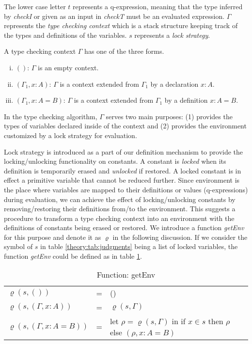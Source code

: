 The lower case letter $t$ represents a q-expression, meaning that the type inferred by \emph{checkI} or given as an input in \emph{checkT} must be an evaluated expression. $\Gamma$ represents the \emph{type checking context} which is a stack structure keeping track of the types and definitions of the variables. $s$ represents a \emph{lock strategy}. 
\begin{definition}
  A type checking context $\Gamma$ has one of the three forms.
  \begin{enumerate}[(i)]
  \item $()$: $\Gamma$ is an empty context.
  \item $(\Gamma_1, x : A)$: $\Gamma$ is a context extended from $\Gamma_1$ by a declaration $x:A$.
  \item $(\Gamma_1, x : A = B)$: $\Gamma$ is a context extended from $\Gamma_1$ by a definition $x:A=B$.
  \end{enumerate}
\end{definition}
In the type checking algorithm, $\Gamma$ serves two main purposes: (1) provides the types of variables declared inside of the context and (2) provides the environment customized by a lock strategy for evaluation.

Lock strategy is introduced as a part of our definition mechanism to provide the locking/unlocking functionality on constants. A constant is \emph{locked} when its definition is temporarily erased and \emph{unlocked} if restored. A locked constant is in effect a primitive variable that cannot be reduced further. Since environment is the place where variables are mapped to their definitions or values (q-expressions) during evaluation, we can achieve the effect of locking/unlocking constants by removing/restoring their definitions from/to the environment. This suggests a procedure to transform a type checking context into an environment with the definitions of constants being erased or restored. We introduce a function \emph{getEnv} for this purpose and denote it as $\varrho$ in the following discussion. If we consider the symbol of $s$ in table \ref{theory:tab:judgments} being a list of locked variables, the function \emph{getEnv} could be defined as in table \ref{theory:tab:getEnv}.

\begin{table}[h] 
  \centering
  \begin{tabular}{l l l}
    $\varrho(s, ())$ & = & () \\
    $\varrho(s, (\Gamma, x : A))$ & = & $\varrho(s, \Gamma)$ \\
    $\varrho(s, (\Gamma, x : A = B))$ & = & let $\rho = \varrho(s, \Gamma)$ in if $x \in s$ then $\rho$ else $(\rho, x : A = B)$
  \end{tabular}
  \caption{Function: getEnv}
  \label{theory:tab:getEnv}
\end{table}

